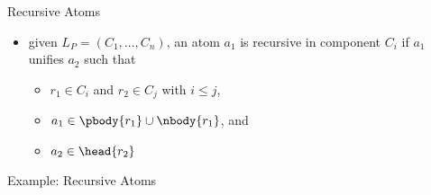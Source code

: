 

\begin{frame}{Recursive Atoms}
  \vfill
  \begin{itemize}
    \item given \(L_P = (C_1, \dots, C_n)\), an atom \(a_1\) is \alert{recursive} in component \(C_i\) if \(a_1\) unifies \(a_2\) such that
      \begin{itemize}
        \item \(r_1 \in C_i\) and \(r_2 \in C_j\) with \(i \leq j\),
        \item \(a_1 \in \pbody{r_1}\cup\nbody{r_1}\), and
        \item \(a_2 \in \head{r_2}\)
      \end{itemize}
  \end{itemize}
\end{frame}

\begin{frame}{Example: Recursive Atoms}
  \vfill
  \begin{center}
  \DepGraph[\alert]
  \end{center}
\end{frame}

